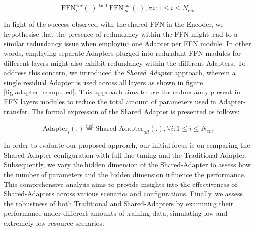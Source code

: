 \begin{equation}
    \text{FFN}_{i}^{enc}(.) \stackrel{\text{tied}}{=} \text{FFN}^{enc}_{all}(.) , \forall i: 1 \leq i \leq N_{enc}
\end{equation}

In light of the success observed with the shared \ac{FFN} in the Encoder, we hypothesise that the presence of redundancy within the \ac{FFN} might lead to a similar redundancy issue when employing one Adapter per \ac{FFN} module. In other words, employing separate Adapters plugged into redundant \ac{FFN} modules for different layers might also exhibit redundancy within the different Adapters. To address this concern, we introduced the \textit{Shared Adapter} approach, wherein a single residual Adapter is used across all layers as shown in figure \ref{fig:adapter_compared}. This approach aims to use the redundancy present in \ac{FFN} layers modules to reduce the total amount of parameters used in Adapter-transfer. The formal expression of the Shared Adapter is presented as follows:

\begin{equation}
    \text{Adapter}_{i}(.) \stackrel{\text{tied}}{=} \text{Shared-Adapter}_{all}(.) , \forall i: 1 \leq i \leq N_{enc}
\end{equation}

In order to evaluate our proposed approach, our initial focus is on comparing the Shared-Adapter configuration with full fine-tuning and the Traditional Adapter. Subsequently, we vary the hidden dimension of the Shared-Adapter to assess how the number of parameters and the hidden dimension influence the performance. This comprehensive analysis aims to provide insights into the effectiveness of Shared-Adapters across various scenarios and configurations. Finally, we assess the robustness of both Traditional and Shared-Adapters by examining their performance under different amounts of training data, simulating low and extremely low resource scenarios.

